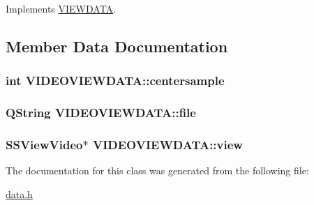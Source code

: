 Implements \hyperlink{class_v_i_e_w_d_a_t_a_1b4cca271e32b8d47b615e75dbf0624e}{VIEWDATA}.

\subsection{Member Data Documentation}
\hypertarget{class_v_i_d_e_o_v_i_e_w_d_a_t_a_bc465d11766026ffab33277647f3c662}{
\subsubsection[{centersample}]{\setlength{\rightskip}{0pt plus 5cm}int {\bf VIDEOVIEWDATA::centersample}}}
\label{class_v_i_d_e_o_v_i_e_w_d_a_t_a_bc465d11766026ffab33277647f3c662}


\hypertarget{class_v_i_d_e_o_v_i_e_w_d_a_t_a_967fb1b0dc2bd0e7fcd21dda9cf582c3}{
\subsubsection[{file}]{\setlength{\rightskip}{0pt plus 5cm}QString {\bf VIDEOVIEWDATA::file}}}
\label{class_v_i_d_e_o_v_i_e_w_d_a_t_a_967fb1b0dc2bd0e7fcd21dda9cf582c3}


\hypertarget{class_v_i_d_e_o_v_i_e_w_d_a_t_a_8f32fc797bb50ce6f93d95de6b8f577d}{
\subsubsection[{view}]{\setlength{\rightskip}{0pt plus 5cm}SSViewVideo$\ast$ {\bf VIDEOVIEWDATA::view}}}
\label{class_v_i_d_e_o_v_i_e_w_d_a_t_a_8f32fc797bb50ce6f93d95de6b8f577d}




The documentation for this class was generated from the following file:\begin{CompactItemize}
\item 
\hyperlink{data_8h}{data.h}\end{CompactItemize}
